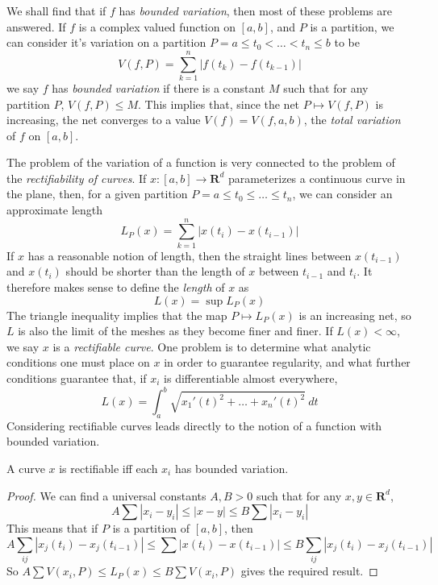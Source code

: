 We shall find that if $f$ has {\it bounded variation}, then most of these problems are answered. If $f$ is a complex valued function on $[a,b]$, and $P$ is a partition, we can consider it's variation on a partition $P = a \leq t_0 < \dots < t_n \leq b$ to be
%
\[ V(f,P) = \sum_{k = 1}^n |f(t_k) - f(t_{k-1})| \]
%
we say $f$ has \emph{bounded variation} if there is a constant $M$ such that for any partition $P$, $V(f,P) \leq M$. This implies that, since the net $P \mapsto V(f,P)$ is increasing, the net converges to a value $V(f) = V(f,a,b)$, the \emph{total variation} of $f$ on $[a,b]$.

The problem of the variation of a function is very connected to the problem of the {\it rectifiability of curves}. If $x: [a,b] \to \mathbf{R}^d$ parameterizes a continuous curve in the plane, then, for a given partition $P = a \leq t_0 \leq \dots \leq t_n$, we can consider an approximate length
%
\[ L_P(x) = \sum_{k = 1}^n |x(t_i) - x(t_{i-1})| \]
%
If $x$ has a reasonable notion of length, then the straight lines between $x(t_{i-1})$ and $x(t_i)$ should be shorter than the length of $x$ between $t_{i-1}$ and $t_i$. It therefore makes sense to define the \emph{length} of $x$ as
%
\[ L(x) = \sup L_P(x) \]
%
The triangle inequality implies that the map $P \mapsto L_P(x)$ is an increasing net, so $L$ is also the limit of the meshes as they become finer and finer. If $L(x) < \infty$, we say $x$ is a \emph{rectifiable curve}. One problem is to determine what analytic conditions one must place on $x$ in order to guarantee regularity, and what further conditions guarantee that, if $x_i$ is differentiable almost everywhere,
%
\[ L(x) = \int_a^b \sqrt{x_1'(t)^2 + \dots + x_n'(t)^2}\ dt \]
%
Considering rectifiable curves leads directly to the notion of a function with bounded variation.

\begin{theorem}
    A curve $x$ is rectifiable iff each $x_i$ has bounded variation.
\end{theorem}
\begin{proof}
    We can find a universal constants $A,B > 0$ such that for any $x,y \in \mathbf{R}^d$,
    \[ A \sum |x_i - y_i| \leq |x-y| \leq B \sum |x_i - y_i| \]
    This means that if $P$ is a partition of $[a,b]$, then
    \[ A \sum_{ij} |x_j(t_i) - x_j(t_{i-1})| \leq \sum |x(t_i) - x(t_{i-1})| \leq B \sum_{ij} |x_j(t_i) - x_j(t_{i-1})| \]
    So $A \sum V(x_i,P) \leq L_P(x) \leq B \sum V(x_i,P)$ gives the required result.
\end{proof}

